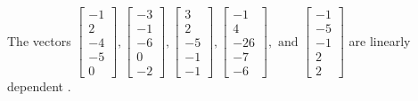\begin{exercise}
\begin{exerciseStatement}
  \end{exerciseStatement}
  \begin{exerciseAnswer}
   The vectors \(\left[\begin{array}{r}
-1 \\
2 \\
-4 \\
-5 \\
0
\end{array}\right] , \left[\begin{array}{r}
-3 \\
-1 \\
-6 \\
0 \\
-2
\end{array}\right] , \left[\begin{array}{r}
3 \\
2 \\
-5 \\
-1 \\
-1
\end{array}\right] , \left[\begin{array}{r}
-1 \\
4 \\
-26 \\
-7 \\
-6
\end{array}\right] , \text{ and } \left[\begin{array}{r}
-1 \\
-5 \\
-1 \\
2 \\
2
\end{array}\right]\) are 
  	 linearly dependent  .
  


  \end{exerciseAnswer}
\end{exercise}